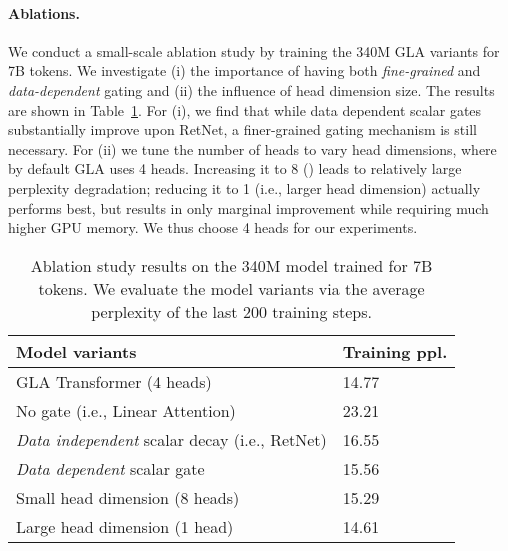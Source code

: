 \paragraph{Ablations.}
We conduct a small-scale ablation study by training the 340M GLA variants for 7B tokens. We investigate (i) the importance of having both \emph{fine-grained} and \emph{data-dependent} gating  and (ii) the influence of head dimension size. The results are shown in Table~\ref{tab:ablation}. For (i), we find that while data dependent scalar gates substantially improve upon RetNet, a finer-grained gating mechanism is still necessary. For (ii) we tune the number of heads to vary head dimensions, where by default GLA uses 4 heads. Increasing it to 8 () leads to relatively large perplexity degradation; reducing it to 1 (i.e., larger head dimension) actually performs best, but results in only marginal improvement while requiring much higher GPU memory. We thus choose 4 heads for our experiments.
\begin{table}

\centering
\small 
        \begin{tabular}{ll}
        \toprule[0.5mm]
     Model variants  &   Training ppl. \\
      \bottomrule
        {GLA Transformer} (4 heads)  & 14.77 \\
\hspace{2mm} {No gate} (i.e., Linear Attention) & 23.21\\
\hspace{2mm} {\emph{Data independent} scalar decay} (i.e., RetNet) & 16.55 \\
\hspace{2mm} {\emph{Data dependent} scalar gate} & 15.56 \\
\hspace{2mm} {Small head dimension (8 heads)} & 15.29 \\
\hspace{2mm} {Large head dimension (1 head)} &  14.61 \\
        \bottomrule
        \end{tabular}
    \vspace{-2mm}
    \caption{Ablation study results on the 340M model trained for 7B tokens. We evaluate the model variants via the average perplexity of the last 200 training steps. 
    }
        \label{tab:ablation}

\end{table}

\vspace{-2mm}
